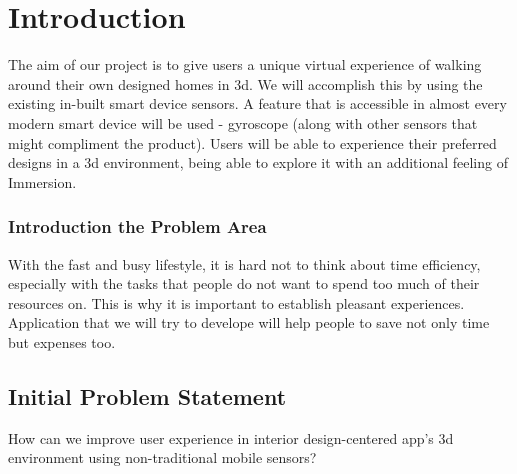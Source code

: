 \chapter{Introduction}
The aim of our project is to give users a unique virtual experience of walking around their own designed homes in 3d. We will accomplish this by using the existing in-built smart device sensors. A feature that is accessible in almost every modern smart device will be used - gyroscope (along with other sensors that might compliment the product). Users will be able to experience their preferred designs in a 3d environment, being able to explore it with an additional feeling of Immersion.
\subsection{Introduction the Problem Area}
With the fast and busy lifestyle, it is hard not to think about time efficiency, especially with the tasks that people do not want to spend too much of their resources on. This is why it is important to establish pleasant experiences. Application that we will try to develope will help people to save not only time but expenses too.  
\section{Initial Problem Statement}
How can we improve user experience in interior design-centered app’s 3d environment using non-traditional mobile sensors?